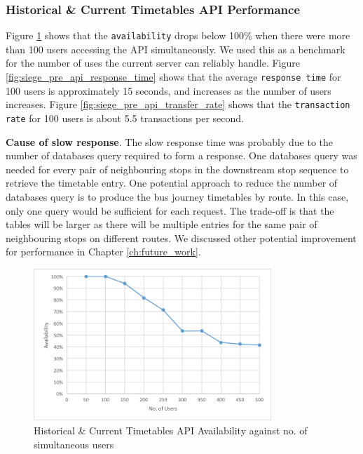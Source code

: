 \subsubsection{Historical \& Current Timetables API Performance}

\par Figure \ref{fig:siege_pre_api_availability} shows that the \texttt{availability} drops below 100\% when there were more than 100 users accessing the API simultaneously. We used this as a benchmark for the number of uses the current server can reliably handle. Figure \ref{fig:siege_pre_api_response_time} shows that the average \texttt{response time} for 100 users is approximately 15 seconds, and increases as the number of users increases. Figure \ref{fig:siege_pre_api_transfer_rate} shows that the \texttt{transaction rate} for 100 users is about 5.5 transactions per second.

\textbf{Cause of slow response}. The slow response time was probably due to the number of databases query required to form a response. One databases query was needed for every pair of neighbouring stops in the downstream stop sequence to retrieve the timetable entry. One potential approach to reduce the number of databases query is to produce the bus journey timetables by route. In this case, only one query would be sufficient for each request. The trade-off is that the tables will be larger as there will be multiple entries for the same pair of neighbouring stops on different routes. We discussed other potential improvement for performance in Chapter \ref{ch:future_work}.

\begin{figure}
\centering
\includegraphics[width=0.8\textwidth]{figures/siege_predictions_api_availability_against_users.pdf}
\caption{\label{fig:siege_pre_api_availability} Historical \& Current Timetables API Availability against no. of simultaneous users}
\end{figure}

